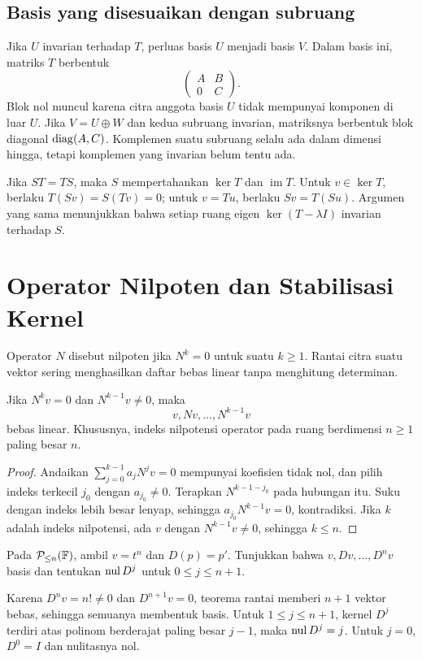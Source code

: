 \subsection{Basis yang disesuaikan dengan subruang}
Jika $U$ invarian terhadap $T$, perluas basis $U$ menjadi basis
$V$. Dalam basis ini, matriks $T$ berbentuk
\[
    \begin{pmatrix}A&B\\0&C\end{pmatrix}.
\]
Blok nol muncul karena citra anggota basis $U$ tidak mempunyai
komponen di luar $U$.
Jika $V=U\oplus W$ dan kedua subruang invarian, matriksnya
berbentuk blok diagonal $\operatorname{diag}(A,C)$.
Komplemen suatu subruang selalu ada dalam dimensi hingga,
tetapi komplemen yang invarian belum tentu ada.

Jika $ST=TS$, maka $S$ mempertahankan $\ker T$ dan
$\operatorname{im}T$. Untuk $v\in\ker T$, berlaku
$T(Sv)=S(Tv)=0$; untuk $v=Tu$, berlaku $Sv=T(Su)$.
Argumen yang sama menunjukkan bahwa setiap ruang eigen
$\ker(T-\lambda I)$ invarian terhadap $S$.

\section{Operator Nilpoten dan Stabilisasi Kernel}

Operator $N$ disebut nilpoten jika $N^k=0$ untuk suatu $k\ge1$.
Rantai citra suatu vektor sering menghasilkan daftar bebas linear
tanpa menghitung determinan.

\begin{teorema}
    Jika $N^kv=0$ dan $N^{k-1}v\ne0$, maka
    \[
        v,Nv,\ldots,N^{k-1}v
    \]
    bebas linear. Khususnya, indeks nilpotensi operator pada
    ruang berdimensi $n\ge1$ paling besar $n$.
\end{teorema}
\begin{proof}
    Andaikan $\sum_{j=0}^{k-1}a_jN^jv=0$ mempunyai koefisien
    tidak nol, dan pilih indeks terkecil $j_0$ dengan $a_{j_0}\ne0$.
    Terapkan $N^{k-1-j_0}$ pada hubungan itu.
    Suku dengan indeks lebih besar lenyap, sehingga
    $a_{j_0}N^{k-1}v=0$, kontradiksi.
    Jika $k$ adalah indeks nilpotensi, ada $v$ dengan
    $N^{k-1}v\ne0$, sehingga $k\le n$.
\end{proof}

\begin{exam}
    Pada $\mathcal P_{\le n}(\mathbb{F})$, ambil $v=t^n$ dan $D(p)=p'$.
    Tunjukkan bahwa $v,Dv,\ldots,D^nv$ basis dan tentukan
    $\operatorname{nul} D^j$ untuk $0\le j\le n+1$.
\end{exam}
\begin{solution}
    Karena $D^nv=n!\ne0$ dan $D^{n+1}v=0$, teorema rantai
    memberi $n+1$ vektor bebas, sehingga semuanya membentuk basis.
    Untuk $1\le j\le n+1$, kernel $D^j$ terdiri atas polinom
    berderajat paling besar $j-1$, maka $\operatorname{nul} D^j=j$.
    Untuk $j=0$, $D^0=I$ dan nulitasnya nol.
\end{solution}

